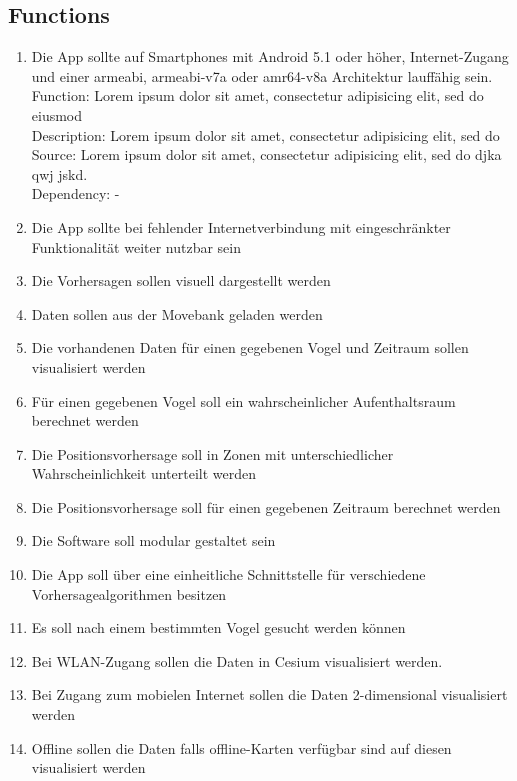 \documentclass[12pt]{article} %
\begin{document}

\subsection{Functions}

\begin{enumerate}[(R1)]
		\item Die App sollte auf Smartphones mit Android 5.1 oder höher, Internet-Zugang und einer armeabi, armeabi-v7a oder amr64-v8a Architektur lauffähig sein. \\
		Function: Lorem ipsum dolor sit amet, consectetur adipisicing elit, sed do eiusmod \\
		Description:  Lorem ipsum dolor sit amet, consectetur adipisicing elit, sed do \\
		Source:  Lorem ipsum dolor sit amet, consectetur adipisicing elit, sed do djka qwj jskd. \\
		Dependency: -
		\item Die App sollte bei fehlender Internetverbindung mit eingeschränkter Funktionalität weiter nutzbar sein
		\item Die Vorhersagen sollen visuell dargestellt werden
		\item Daten sollen aus der Movebank geladen werden
		\item Die vorhandenen Daten für einen gegebenen Vogel und Zeitraum sollen visualisiert werden
		\item Für einen gegebenen Vogel soll ein wahrscheinlicher Aufenthaltsraum berechnet werden
		\item Die Positionsvorhersage soll in Zonen mit unterschiedlicher Wahrscheinlichkeit unterteilt werden
		\item Die Positionsvorhersage soll für einen gegebenen Zeitraum berechnet werden
		\item Die Software soll modular gestaltet sein
		\item Die App soll über eine einheitliche Schnittstelle für verschiedene Vorhersagealgorithmen besitzen
		\item Es soll nach einem bestimmten Vogel gesucht werden können
		\item Bei WLAN-Zugang sollen die Daten in Cesium visualisiert werden.
		\item Bei Zugang zum mobielen Internet sollen die Daten 2-dimensional visualisiert werden
		\item Offline sollen die Daten falls offline-Karten verfügbar sind auf diesen visualisiert werden

\end{enumerate}
\end{document}
